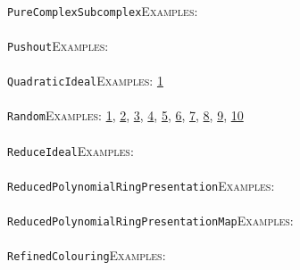 \documentclass[a4paper,11pt]{report}
\begin{document}
{{ \\
 \texttt{PureComplexSubcomplex}{\nobreakspace}{\nobreakspace}{\nobreakspace}{\nobreakspace}\textsc{Examples:} \\
 \\
 \texttt{Pushout}{\nobreakspace}{\nobreakspace}{\nobreakspace}{\nobreakspace}\textsc{Examples:} \\
 \\
 \texttt{QuadraticIdeal}{\nobreakspace}{\nobreakspace}{\nobreakspace}{\nobreakspace}\textsc{Examples:} \href{tutorial/chap10.html} {1}{\nobreakspace} \\
 \\
 \texttt{Random}{\nobreakspace}{\nobreakspace}{\nobreakspace}{\nobreakspace}\textsc{Examples:} \href{../www/SideLinks/About/aboutLinks.html} {1}{\nobreakspace}, \href{../www/SideLinks/About/aboutParallel.html} {2}{\nobreakspace}, \href{../www/SideLinks/About/aboutCocycles.html} {3}{\nobreakspace}, \href{../www/SideLinks/About/aboutQuandles2.html} {4}{\nobreakspace}, \href{../www/SideLinks/About/aboutQuandles.html} {5}{\nobreakspace}, \href{../www/SideLinks/About/aboutCubical.html} {6}{\nobreakspace}, \href{../www/SideLinks/About/aboutRandomComplexes.html} {7}{\nobreakspace}, \href{../www/SideLinks/About/aboutFunctorial.html} {8}{\nobreakspace}, \href{../www/SideLinks/About/aboutKnots.html} {9}{\nobreakspace}, \href{../www/SideLinks/About/aboutKnotsQuandles.html} {10}{\nobreakspace} \\
 \\
 \texttt{ReduceIdeal}{\nobreakspace}{\nobreakspace}{\nobreakspace}{\nobreakspace}\textsc{Examples:} \\
 \\
 \texttt{ReducedPolynomialRingPresentation}{\nobreakspace}{\nobreakspace}{\nobreakspace}{\nobreakspace}\textsc{Examples:} \\
 \\
 \texttt{ReducedPolynomialRingPresentationMap}{\nobreakspace}{\nobreakspace}{\nobreakspace}{\nobreakspace}\textsc{Examples:} \\
 \\
 \texttt{RefinedColouring}{\nobreakspace}{\nobreakspace}{\nobreakspace}{\nobreakspace}\textsc{Examples:} \\
 \\
}}
\end{document}
